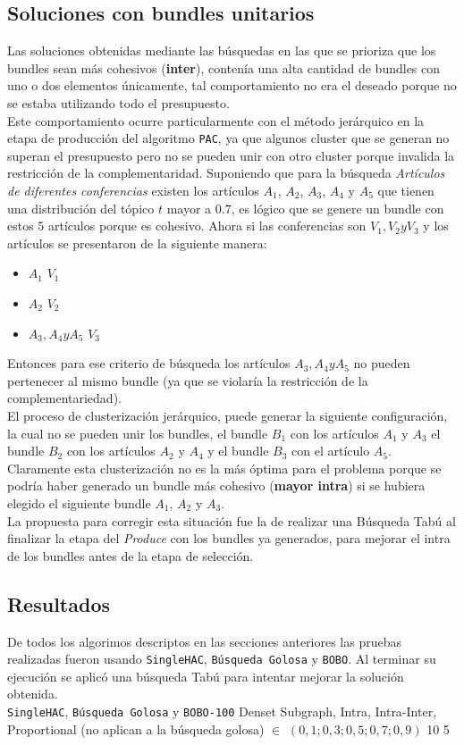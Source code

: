 \subsection{Soluciones con bundles unitarios}
Las soluciones obtenidas mediante las búsquedas en las que se prioriza que los bundles sean más cohesivos (\textbf{inter}), contenía una alta cantidad de bundles con uno o dos elementos únicamente, tal comportamiento no era el deseado porque no se estaba utilizando todo el presupuesto.\\
Este comportamiento ocurre particularmente con el método jerárquico en la etapa de producción del algoritmo \texttt{PAC}, ya que algunos cluster que se generan no superan el presupuesto pero no se pueden unir con otro cluster porque invalida la restricción de la complementaridad. Suponiendo que para la búsqueda \textit{Artículos de diferentes conferencias} existen los artículos $A_1$, $A_2$, $A_3$, $A_4$ y $A_5$ que tienen una distribución del tópico $t$ mayor a $0.7$, es lógico que se genere un bundle con estos 5 artículos porque es cohesivo. Ahora si las conferencias son $V_1, V_2 y V_3$ y los artículos se presentaron de la siguiente manera:
\begin{itemize}
	\item $A_1$ \rightarrow $V_1$
	\item $A_2$ \rightarrow $V_2$
	\item $A_3, A_4 y A_5$ \rightarrow $V_3$
\end{itemize} 

Entonces para ese criterio de búsqueda los artículos $A_3, A_4 y A_5$ no pueden pertenecer al mismo bundle (ya que se violaría la restricción de la complementariedad).\\
El proceso de clusterización jerárquico, puede generar la siguiente configuración, la cual no se pueden unir los bundles, el bundle $B_1$ con los artículos $A_1$ y $A_3$ el bundle $B_2$ con los artículos $A_2$ y $A_4$ y el bundle $B_3$ con el artículo $A_5$. Claramente esta clusterización no es la más óptima para el problema porque se podría haber generado un bundle más cohesivo (\textbf{mayor intra}) si se hubiera elegido el siguiente bundle $A_1$, $A_2$ y $A_3$.\\
La propuesta para corregir esta situación fue la de realizar una Búsqueda Tabú al finalizar la etapa del \textit{Produce} con los bundles ya generados, para mejorar el intra de los bundles antes de la etapa de selección.
\subsection{Resultados}
De todos los algorimos descriptos en las secciones anteriores las pruebas realizadas fueron usando \texttt{SingleHAC}, \texttt{Búsqueda Golosa} y \texttt{BOBO}. Al terminar su ejecución se aplicó una búsqueda Tabú para intentar mejorar la solución obtenida.\\
\Solucion
{}
{\texttt{SingleHAC}, \texttt{Búsqueda Golosa} y \texttt{BOBO-100}}
{Denset Subgraph, Intra, Intra-Inter, Proportional (no aplican a la búsqueda golosa)}
{$\in$ $(0,1; 0,3; 0,5; 0,7; 0,9)$}
{10}
{5}


